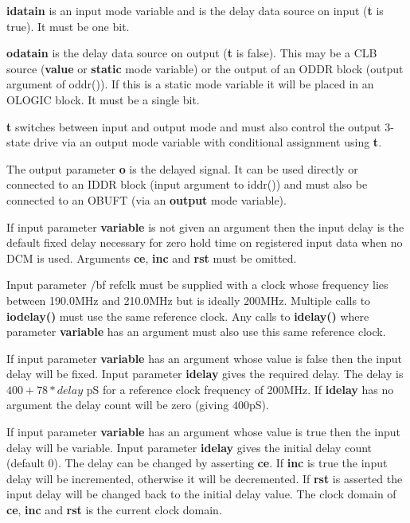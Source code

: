             {\bf idatain} is an input mode variable and is the delay data
            source on input ({\bf t} is true). It must be one bit.

            {\bf odatain} is the delay data source on output ({\bf t} is false).
            This may be a CLB source ({\bf value} or {\bf static} mode variable)
            or the output of an ODDR block (output argument of oddr()). If this
            is a static mode variable it will be placed in an OLOGIC block. It must
            be a single bit.

            {\bf t} switches between input and output mode and must also control
            the output 3-state drive via an output mode variable with
            conditional assignment using {\bf t}.

            The output parameter {\bf o} is the delayed signal. It can be used
            directly or connected to an IDDR block (input argument to iddr())
            and must also be connected to an OBUFT (via an {\bf output} mode
            variable).

            If input parameter {\bf variable} is not given an argument then the
            input delay is the default fixed delay necessary for zero hold time
            on registered input data when no DCM is used. Arguments {\bf ce},
            {\bf inc} and {\bf rst} must be omitted.

            Input parameter {/bf refclk} must be supplied with a clock whose
            frequency lies between 190.0MHz and 210.0MHz but is ideally 200MHz.
            Multiple calls to {\bf iodelay()} must use the same reference clock.
            Any calls to {\bf idelay()} where parameter {\bf variable} has an
            argument must also use this same reference clock.

            If input parameter {\bf variable} has an argument whose value is
            false then the input delay will be fixed. Input parameter {\bf
            idelay} gives the required delay. The delay is $400 + 78 * delay$ pS
            for a reference clock frequency of 200MHz. If {\bf idelay} has no
            argument the delay count will be zero (giving $400$pS).

            If input parameter {\bf variable} has an argument whose value is
            true then the input delay will be variable. Input parameter {\bf
            idelay} gives the initial delay count (default 0). The delay can be
            changed by asserting {\bf ce}. If {\bf inc} is true the input delay
            will be incremented, otherwise it will be decremented. If {\bf rst}
            is asserted the input delay will be changed back to the initial
            delay value. The clock domain of {\bf ce}, {\bf inc} and {\bf rst}
            is the current clock domain.


